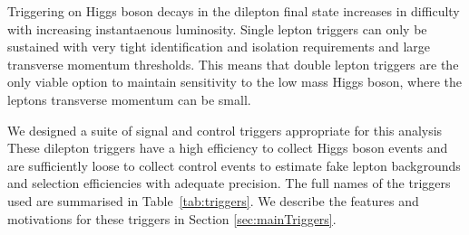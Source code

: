 Triggering on Higgs boson decays in the dilepton final state increases 
in difficulty with increasing instantaenous luminosity.
Single lepton triggers can only be sustained with very tight identification and
isolation requirements and large transverse momentum thresholds.
This means that double lepton triggers are the only viable option to maintain
sensitivity to the low mass Higgs boson, where the leptons transverse momentum
can be small.

We designed a suite of signal and control triggers appropriate for this analysis
These dilepton triggers have a high efficiency to collect Higgs boson events
and are sufficiently loose to collect control events to estimate
fake lepton backgrounds and selection efficiencies with adequate precision.
The full names of the triggers used are summarised in Table~\ref{tab:triggers}.  
We describe the features and motivations for these triggers in Section \ref{sec:mainTriggers}.

